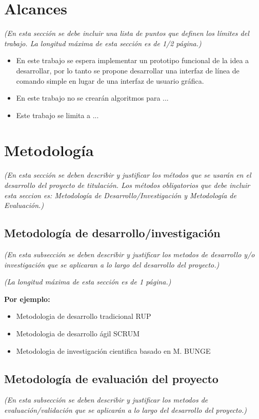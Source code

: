\documentclass[11pt,letterpaper]{article}
\begin{document}
\section{Alcances}
\emph{(En esta sección se debe incluir una lista de puntos que definen los límites del trabajo. La longitud máxima de esta sección es de 1/2 página.)}
\begin{itemize}
\item En este trabajo se espera implementar un prototipo funcional de la idea a desarrollar, por lo tanto se propone desarrollar una interfaz de línea de comando simple en lugar de una interfaz de usuario gráfica. 
\item En este trabajo no se crearán algoritmos para ... 
\item Este trabajo se limita a ...
\end{itemize}



\section{Metodología}
\emph{(En esta sección se deben describir y justificar los métodos que se usarán en el desarrollo del proyecto de titulación. Los métodos obligatorios que debe incluir esta seccion es: Metodología de Desarrollo/Investigación y Metodología de Evaluación.)}

\subsection{Metodología de desarrollo/investigación}

\emph{(En esta subsección se deben describir y justificar los metodos de desarrollo y/o investigación que se aplicaran a lo largo del desarrollo del proyecto.)}


\emph{(La longitud máxima de esta sección es de 1 página.)}

\textbf{Por ejemplo:}
\begin{itemize}
	\item Metodologia de desarrollo tradicional RUP
	\item Metodologia de desarrollo ágil SCRUM
	\item Metodologia de investigación cientifica basado en M. BUNGE
\end{itemize}

\subsection{Metodología de evaluación del proyecto}
\emph{(En esta subsección se deben describir y justificar los metodos de evaluación/validación que se aplicarán a lo largo del desarrollo del proyecto.)}
\end{document}
